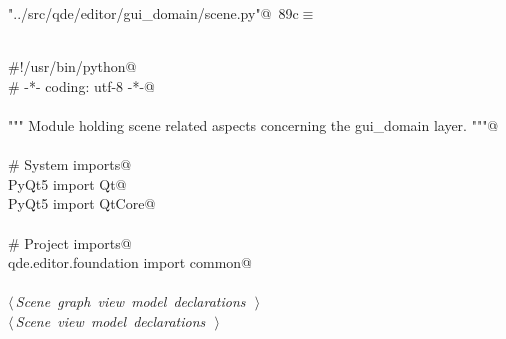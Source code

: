 \documentclass[
    a4paper,      %
    10pt,         %
    openright,    %
    notitlepage,  %
    parskip=half, %
]{scrreprt}       %
\theoremstyle{definition}                    %
\begin{document}
\begin{flushleft} \small
\begin{minipage}{\linewidth}\label{scrap142}\raggedright\small
{} \verb@"../src/qde/editor/gui_domain/scene.py"@\nobreak\ {\footnotesize {89c}}$\equiv$
\vspace{-1ex}
\begin{list}{}{} \item
\mbox{}\lstinline@@\\
\mbox{}\lstinline@#!/usr/bin/python@\\
\mbox{}\lstinline@# -*- coding: utf-8 -*-@\\
\mbox{}\lstinline@@\\
\mbox{}\lstinline@""" Module holding scene related aspects concerning the gui_domain layer. """@\\
\mbox{}\lstinline@@\\
\mbox{}\lstinline@# System imports@\\
\mbox{}\lstinline@from PyQt5 import Qt@\\
\mbox{}\lstinline@from PyQt5 import QtCore@\\
\mbox{}\lstinline@@\\
\mbox{}\lstinline@# Project imports@\\
\mbox{}\lstinline@from qde.editor.foundation import common@\\
\mbox{}\lstinline@@\\
\mbox{}\lstinline@@\hbox{$\langle\,${\itshape Scene graph view model declarations}\nobreak\ {\footnotesize {}}$\,\rangle$}\lstinline@@\\
\mbox{}\lstinline@@\hbox{$\langle\,${\itshape Scene view model declarations}\nobreak\ {\footnotesize {}}$\,\rangle$}\lstinline@@\\
\mbox{}\lstinline@@{\NWsep}
\end{list}
\vspace{-1.5ex}
\footnotesize
\begin{list}{}{\setlength{\itemsep}{-\parsep}\setlength{\itemindent}{-\leftmargin}}

\item{}
\end{list}
\end{minipage}\vspace{4ex}
\end{flushleft}
\end{document}
